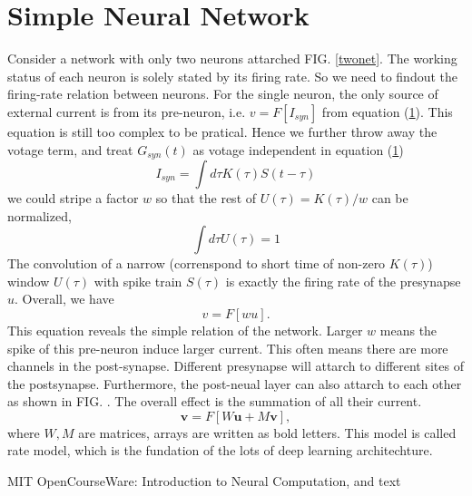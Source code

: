 \documentclass[11pt]{article}
\begin{document}
\section{Simple Neural Network}
Consider a network with only two neurons attarched FIG. \ref{twonet}. The
working status of each neuron is solely stated by its firing rate. So we need to
findout the firing-rate relation between neurons. For the single neuron, the only source of external current is from its
pre-neuron, i.e. $v = F[I_{syn}]$ from equation (\ref{}). This equation is still
too complex to be pratical. Hence we further throw away the votage term, and
treat $G_{syn}(t)$ as votage independent in equation (\ref{})
\begin{equation}
  I_{syn} = \int{d\tau}K(\tau)S(t - \tau)
\end{equation}
we could stripe a factor $w$ so that the rest of $U(\tau) = K(\tau) / w$ can be normalized,
\begin{equation}
  \int{d\tau}U(\tau) = 1 
\end{equation}
The convolution of a narrow (correnspond to short time of non-zero $K(\tau)$)
window $U(\tau)$ with spike train $S(\tau)$ is exactly the firing rate of the
presynapse $u$. Overall, we have
\begin{equation}
  v = F[w u].
\end{equation}
This equation reveals the simple relation of the network. Larger $w$ means the
spike of this pre-neuron induce larger current. This often means there are more
channels in the post-synapse. Different presynapse will attarch to different
sites of the postsynapse. Furthermore, the post-neual layer can also attarch to
each other as shown in FIG. . The overall effect is the summation of all their
current.
\begin{equation}
  \boldsymbol{v} = F[W\boldsymbol{u} + M \boldsymbol{v}],
\end{equation}
where $W, M$ are matrices, arrays are written as bold letters. This model is
called rate model, which is the fundation of the lots of deep learning
architechture.

\begin{thebibliography}{100}
MIT OpenCourseWare: Introduction to Neural Computation, and text
\end{thebibliography}
\end{document}
